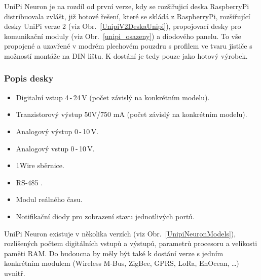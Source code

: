 UniPi Neuron je na rozdíl od první verze, kdy se rozšiřujicí deska RaspberryPi distribuovala zvlášt, již hotové řešení, které se skládá z RaspberryPi, rozšiřující desky UniPi verze 2 (viz Obr.~\ref{UnipiV2DeskaUnipi}), propojovací desky pro komunikační moduly (viz Obr.~\ref{unipi_osazeny}) a diodového panelu. To vše propojené a uzavřené v modrém plechovém pouzdru s profilem ve tvaru jističe s možností montáže na DIN lištu. K dostání je tedy pouze jako hotový výrobek.


\subsubsection{Popis desky}
\begin{itemize}
\item Digitalní vstup 4\,-\,24\,V (počet závislý na konkrétním modelu).
\item Tranzistorový výstup 50V/750 mA (počet závislý na konkrétním modelu).
\item Analogový výstup 0\,-\,10\,V.
\item Analogový vstup 0\,-\,10\,V.
\item 1Wire sběrnice.
\item RS-485 .
\item Modul reálného času.
\item Notifikační diody pro zobrazení stavu jednotlivých portů.
\end{itemize}

\vspace{10pt}
UniPi Neuron existuje v několika verzích (viz Obr.~\ref{UnipiNeuronModels}), rozlišených počtem digitálních vstupů a výstupů, parametrů procesoru a velikosti paměti RAM. Do budoucna by měly být také k dostání verze s jedním konkrétním modulem (Wireless M-Bus, ZigBee, GPRS, LoRa, EnOcean, \ldots) uvnitř.

